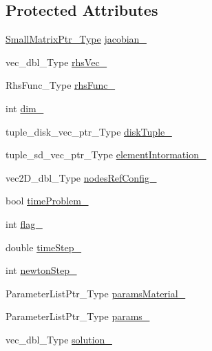 \subsection*{Protected Attributes}
\begin{DoxyCompactItemize}
\item 
\hyperlink{classFEDD_1_1AssembleFE_afb5fb5dca3aab59f697a25884e99e894}{Small\+Matrix\+Ptr\+\_\+\+Type} \hyperlink{classFEDD_1_1AssembleFE_a12d587892b238ecf6b8fdb0b91c2b0be}{jacobian\+\_\+}
\item 
vec\+\_\+dbl\+\_\+\+Type \hyperlink{classFEDD_1_1AssembleFE_a8eff2b1a9fc0125931206e83e2ab8bbd}{rhs\+Vec\+\_\+}
\item 
Rhs\+Func\+\_\+\+Type \hyperlink{classFEDD_1_1AssembleFE_a2c3232bc8b6d6d9e23ab0a745e103e2a}{rhs\+Func\+\_\+}
\item 
int \hyperlink{classFEDD_1_1AssembleFE_a8419f1d876b0da5f920ab3d1d21e0401}{dim\+\_\+}
\item 
tuple\+\_\+disk\+\_\+vec\+\_\+ptr\+\_\+\+Type \hyperlink{classFEDD_1_1AssembleFE_afd156e8e0ad2ca015a604290919d5794}{disk\+Tuple\+\_\+}
\item 
tuple\+\_\+sd\+\_\+vec\+\_\+ptr\+\_\+\+Type \hyperlink{classFEDD_1_1AssembleFE_a75ac3bec40089aca4566313ae7dd2650}{element\+Intormation\+\_\+}
\item 
vec2\+D\+\_\+dbl\+\_\+\+Type \hyperlink{classFEDD_1_1AssembleFE_ab2892bff598d5a4f784d4f30ddf4836c}{nodes\+Ref\+Config\+\_\+}
\item 
bool \hyperlink{classFEDD_1_1AssembleFE_aaa84c5ca06ca8dcd1ad82d7d66ac8e4c}{time\+Problem\+\_\+}
\item 
int \hyperlink{classFEDD_1_1AssembleFE_a222f91cd1b4296d37a520e510692ca8e}{flag\+\_\+}
\item 
double \hyperlink{classFEDD_1_1AssembleFE_aedef52d32fc32f3b70877f705968afcc}{time\+Step\+\_\+}
\item 
int \hyperlink{classFEDD_1_1AssembleFE_a39520c726ee8a6a48258adc555f6df77}{newton\+Step\+\_\+}
\item 
Parameter\+List\+Ptr\+\_\+\+Type \hyperlink{classFEDD_1_1AssembleFE_ac270e80971846b789e7cb2507fe345ba}{params\+Material\+\_\+}
\item 
Parameter\+List\+Ptr\+\_\+\+Type \hyperlink{classFEDD_1_1AssembleFE_a1b7f9f820f3da30ff7dd8438ada14b3b}{params\+\_\+}
\item 
vec\+\_\+dbl\+\_\+\+Type \hyperlink{classFEDD_1_1AssembleFE_a5a0789e00592c0885abac42748c96fd7}{solution\+\_\+}
\end{DoxyCompactItemize}
